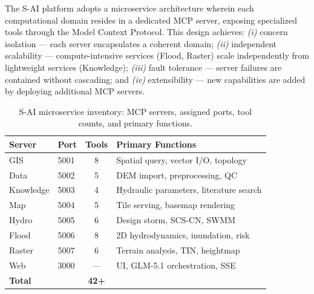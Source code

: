 \documentclass[11pt, a4paper]{article}
\begin{document}
The S-AI platform adopts a microservice architecture wherein each computational domain resides in a dedicated MCP server, exposing specialized tools through the Model Context Protocol. This design achieves: \emph{(i)} concern isolation --- each server encapsulates a coherent domain; \emph{(ii)} independent scalability --- compute-intensive services (Flood, Raster) scale independently from lightweight services (Knowledge); \emph{(iii)} fault tolerance --- server failures are contained without cascading; and \emph{(iv)} extensibility --- new capabilities are added by deploying additional MCP servers.

\begin{table}[htbp]
\centering
\caption{S-AI microservice inventory: MCP servers, assigned ports, tool counts, and primary functions.}
\label{tab:servers}
\small
\begin{tabular}{@{}llcl@{}}
\toprule
\textbf{Server} & \textbf{Port} & \textbf{Tools} & \textbf{Primary Functions} \\
\midrule
GIS & 5001 & 8 & Spatial query, vector I/O, topology \\
Data & 5002 & 5 & DEM import, preprocessing, QC \\
Knowledge & 5003 & 4 & Hydraulic parameters, literature search \\
Map & 5004 & 5 & Tile serving, basemap rendering \\
Hydro & 5005 & 6 & Design storm, SCS-CN, SWMM \\
Flood & 5006 & 8 & 2D hydrodynamics, inundation, risk \\
Raster & 5007 & 6 & Terrain analysis, TIN, heightmap \\
Web & 3000 & --- & UI, GLM-5.1 orchestration, SSE \\
\midrule
\textbf{Total} & & \textbf{42+} & \\
\bottomrule
\end{tabular}
\end{table}
\end{document}
